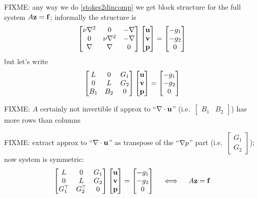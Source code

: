 FIXME: any way we do \eqref{stokes2dincomp} we get block structure for the full system $A \mathbf{z} = \mathbf{f}$; informally the structure is
  $$\begin{bmatrix}
    \nu\nabla^2 & 0 & -\nabla \\
    0 & \nu\nabla^2 & -\nabla \\
    \nabla & \nabla & 0
    \end{bmatrix}
    \begin{bmatrix}
    \mathbf{u} \\ \mathbf{v} \\ \mathbf{p}
    \end{bmatrix}
    =
    \begin{bmatrix}
    - g_1 \\ - g_2 \\ 0
    \end{bmatrix}
    $$
but let's write
  $$\begin{bmatrix}
    L & 0 & G_1 \\
    0 & L & G_2 \\
    B_1 & B_2 & 0
    \end{bmatrix}
    \begin{bmatrix}
    \mathbf{u} \\ \mathbf{v} \\ \mathbf{p}
    \end{bmatrix}
    =
    \begin{bmatrix}
    - g_1 \\ - g_2 \\ 0
    \end{bmatrix}
    $$

FIXME: $A$ certainly not invertible if approx to ``$\nabla\cdot \mathbf{u}$'' (i.e.~$\begin{bmatrix} B_1 & B_2 \end{bmatrix}$) has more rows than columns

FIXME: extract approx to ``$\nabla\cdot \mathbf{u}$'' as transpose of the ``$\nabla p$'' part (i.e.~$\begin{bmatrix} G_1 \\ G_2 \end{bmatrix}$); now system is symmetric:
    $$\begin{bmatrix}
    L & 0 & G_1 \\
    0 & L & G_2 \\
    G_1^\top & G_2^\top & 0
    \end{bmatrix}
    \begin{bmatrix}
    \mathbf{u} \\ \mathbf{v} \\ \mathbf{p}
    \end{bmatrix}
    =
    \begin{bmatrix}
    - g_1 \\ - g_2 \\ 0
    \end{bmatrix}
    \quad \iff \quad A\mathbf{z} = \mathbf{f}
    $$

